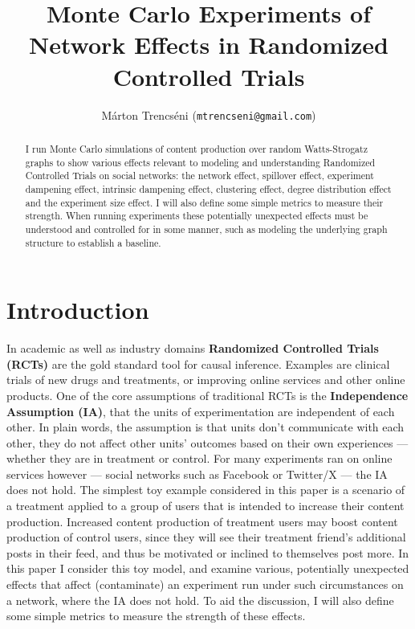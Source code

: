 \documentclass[final,5p,times,twocolumn,authoryear]{elsarticle}
\begin{document}
\begin{frontmatter}

\title{Monte Carlo Experiments of Network Effects in Randomized Controlled Trials}

\author{Márton Trencséni (\texttt{mtrencseni@gmail.com})}

\begin{abstract}
I run Monte Carlo simulations of content production over random Watts-Strogatz graphs to show various effects relevant to modeling and understanding Randomized Controlled Trials on social networks: the network effect, spillover effect, experiment dampening effect, intrinsic dampening effect, clustering effect, degree distribution effect and the experiment size effect. I will also define some simple metrics to measure their strength. When running experiments these potentially unexpected effects must be understood and controlled for in some manner, such as modeling the underlying graph structure to establish a baseline.
 
\end{abstract}

\end{frontmatter}

\section{Introduction}

In academic as well as industry domains \textbf{Randomized Controlled Trials (RCTs)} are the gold standard tool for causal inference. Examples are clinical trials of new drugs and treatments, or improving online services and other online products. One of the core assumptions of traditional RCTs is the \textbf{Independence Assumption (IA)}, that the units of experimentation are independent of each other. In plain words, the assumption is that units don't communicate with each other, they do not affect other units' outcomes based on their own experiences --- whether they are in treatment or control. For many experiments ran on online services however --- social networks such as Facebook or Twitter/X --- the IA does not hold. The simplest toy example considered in this paper is a scenario of a treatment applied to a group of users that is intended to increase their content production. Increased content production of treatment users may boost content production of control users, since they will see their treatment friend's additional posts in their feed, and thus be motivated or inclined to themselves post more. In this paper I consider this toy model, and examine various, potentially unexpected effects that affect (contaminate) an experiment run under such circumstances on a network, where the IA does not hold. To aid the discussion, I will also define some simple metrics to measure the strength of these effects.
\end{document}
